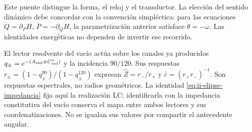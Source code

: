 Este puente distingue la forma, el reloj y el transductor. La elección
del sentido dinámico debe concordar con la convención simpléctica: para
las ecuaciones \(\dot Q=\partial_PH\),
\(\dot P=-\partial_QH\), la parametrización anterior satisface
\(\dot\theta=-\omega\). Las identidades energéticas no dependen
de invertir ese recorrido.

El lector resolvente del vacío actúa sobre los canales ya producidos
\(q_\pm=e^{-(A_{\rm rad}\pm C^*_{\rm rad})}\) y la incidencia
\(90/120\). Sus respuestas
\(r_\pm=(1-q_\pm^{90})/(1-q_\pm^{120})\) expresan
\(\widehat Z=r_-/r_+\) y \(\widehat c=(r_+r_-)^{-1}\).
Son respuestas espectrales, no radios geométricos. La identidad
\eqref{eq:ii-elipse-impedancia} fija aquí la realización LC;
identificarla con la impedancia constitutiva del vacío conserva el mapa
entre ambos lectores y sus coordenatizaciones. No se igualan sus valores por compartir
el antecedente angular.
